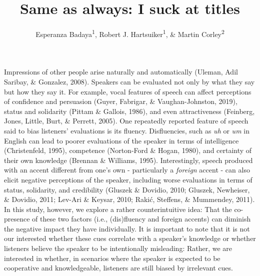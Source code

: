 \documentclass[
  man,floatsintext]{apa7}
\title{Same as always: I suck at titles}
\author{Esperanza Badaya\textsuperscript{1}, Robert J. Hartsuiker\textsuperscript{1}, \& Martin Corley\textsuperscript{2}}
\date{}
\affiliation{\vspace{0.5cm}\textsuperscript{1} Ghent University\\\textsuperscript{2} University of Edinburgh}
\begin{document}
\maketitle

Impressions of other people arise naturally and automatically (Uleman, Adil Saribay, \& Gonzalez, 2008). Speakers can be evaluated not only by what they say but how they say it. For example, vocal features of speech can affect perceptions of confidence and persuasion (Guyer, Fabrigar, \& Vaughan-Johnston, 2019), status and solidarity (Pittam \& Gallois, 1986), and even attractiveness (Feinberg, Jones, Little, Burt, \& Perrett, 2005). One repeatedly reported feature of speech said to bias listeners' evaluations is its fluency. Disfluencies, such as \emph{uh} or \emph{um} in English can lead to poorer evaluations of the speaker in terms of intelligence (Christenfeld, 1995), competence (Norton-Ford \& Hogan, 1980), and certainty of their own knowledge (Brennan \& Williams, 1995). Interestingly, speech produced with an accent different from one's own - particularly a \emph{foreign} accent - can also elicit negative perceptions of the speaker, including worse evaluations in terms of status, solidarity, and credibility (Gluszek \& Dovidio, 2010; Gluszek, Newheiser, \& Dovidio, 2011; Lev-Ari \& Keysar, 2010; Rakić, Steffens, \& Mummendey, 2011). In this study, however, we explore a rather counterintuitive idea: That the co-presence of these two factors (i.e., (dis)fluency and foreign accents) can diminish the negative impact they have individually. It is important to note that it is not our interested whether these cues correlate with a speaker's knowledge or whether listeners believe the speaker to be intentionally misleading: Rather, we are interested in whether, in scenarios where the speaker is expected to be cooperative and knowledgeable, listeners are still biased by irrelevant cues.
\end{document}
